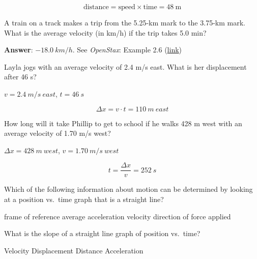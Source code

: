 \documentclass[]{exam}
\begin{document}
\begin{questions}
\begin{questions}
\begin{solution}
\begin{equation*}
    \text{distance} = \text{speed} \times \text{time} = \SI{48}{\meter} 
\end{equation*}
\end{solution}


\question
A train on a track makes a trip from the 5.25-km mark to the 3.75-km mark. What is the average velocity (in km/h) if the trip takes 5.0 min?

\begin{solution}
    \textbf{Answer}: $\SI{-18.0}{km/h}$. See \textit{OpenStax}: Example 2.6 (\href{https://openstax.org/books/college-physics/pages/2-4-acceleration}{link})
\end{solution}

\question
Layla jogs with an average velocity of 2.4 m/s east. What is her displacement after 46 s?

\begin{solution}
    $v = \SI{2.4}{m/s\ east}$, $t = \SI{46}{s}$

\begin{equation*}
    \Delta{x} = v \cdot t = \SI{110}{m\ east}
\end{equation*}
\end{solution}


\question
How long will it take Phillip to get to school if he walks 428 m west with an average velocity of 1.70 m/s west?

\begin{solution}
    $\Delta{x} = \SI{428}{m\ west}$, $v = \SI{1.70}{m/s\ west}$

\begin{equation*}
    t = \frac{\Delta{x}}{v} = \SI{252}{s}
\end{equation*}
\end{solution}


\question
Which of the following information about motion can be determined by looking at a position vs.~time graph that is a straight line?

\begin{choices}
\choice frame of reference
\choice average acceleration
\CorrectChoice velocity
\choice direction of force applied
\end{choices}

\question
What is the slope of a straight line graph of position vs.~time?

\begin{choices}
\CorrectChoice Velocity
\choice Displacement
\choice Distance
\choice Acceleration
\end{choices}


\end{questions}
\end{questions}
\end{document}
